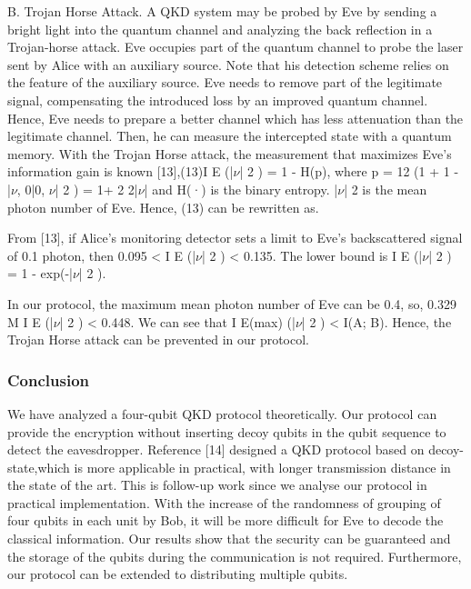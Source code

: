B. Trojan Horse Attack. A QKD system may be probed by Eve by sending a bright light into the quantum channel and analyzing the back reflection in a Trojan-horse attack. Eve occupies part of the quantum channel to probe the laser sent by Alice with an auxiliary source. Note that his detection scheme relies on the feature of the auxiliary source. Eve needs to remove part of the legitimate signal, compensating the introduced loss by an improved quantum channel. Hence, Eve needs to prepare a better channel which has less attenuation than the legitimate channel. Then, he can measure the intercepted state with a quantum memory.
With the Trojan Horse attack, the measurement that maximizes Eve’s information gain is known [13],(13)I E (|$\nu$| 2 ) = 1 - H(p), where p = 12 (1 + 1 - |$\nu$, 0|0, $\nu$| 2 ) = 1+ 2 2|$\nu$| and H(·) is the binary entropy. |$\nu$| 2 is the mean photon number of Eve. Hence, (13) can be rewritten as.

From [13], if Alice’s monitoring detector sets a limit to Eve’s backscattered signal of 0.1 photon, then 0.095 < I E (|$\nu$| 2 ) < 0.135. The lower bound is I E (|$\nu$| 2 ) = 1 - exp(-|$\nu$| 2 ).

In our protocol, the maximum mean photon number of Eve can be 0.4, so, 0.329 M I E (|$\nu$| 2 ) < 0.448. We can see that I E(max) (|$\nu$| 2 ) < I(A; B). Hence, the Trojan Horse attack can be prevented in our protocol.

\subsubsection{Conclusion}
We have analyzed a four-qubit QKD protocol theoretically. Our protocol can provide the encryption without inserting decoy qubits in the qubit sequence to detect the eavesdropper. Reference [14] designed a QKD protocol based on decoy-state,which is more applicable in practical, with longer transmission distance in the state of the art. This is follow-up work since we analyse our protocol in practical implementation. With the increase of the randomness of grouping of four qubits in each unit by Bob, it will be more difficult for Eve to decode the classical information. Our results show that the security can be guaranteed and the storage of the qubits during the communication is not required. Furthermore, our protocol can be extended to distributing multiple qubits.

\subsection{\trnas}
